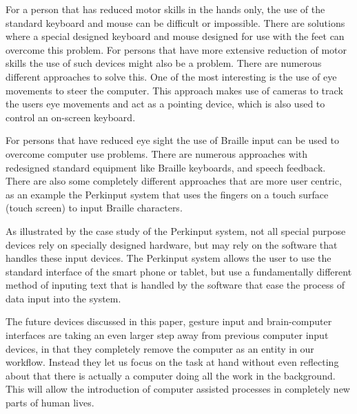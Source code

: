 
For a person that has reduced motor skills in the hands only, the use of the standard keyboard and mouse can be difficult or impossible. There are solutions where a special designed keyboard and mouse designed for use with the feet can overcome this problem.
For persons that have more extensive reduction of motor skills the use of such devices might also be a problem. There are numerous different approaches to solve this. One of the most interesting is the use of eye movements to steer the computer. This approach makes use of cameras to track the users eye movements and act as a pointing device, which is also used to control an on-screen keyboard. 

For persons that have reduced eye sight the use of Braille input can be used to overcome computer use problems. There are numerous approaches with redesigned standard equipment like Braille keyboards, and speech feedback. There are also some completely different approaches that are more user centric, as an example the Perkinput system that uses the fingers on a touch surface (touch screen) to input Braille characters.

As illustrated by the case study of the Perkinput system, not all special purpose devices rely on specially designed hardware, but may rely on the software that handles these input devices. The Perkinput system allows the user to use the standard interface of the smart phone or tablet, but use a fundamentally different method of inputing text that is handled by the software that ease the process of data input into the system.




The future devices discussed in this paper, gesture input and brain-computer interfaces are taking an even larger step away from previous computer input devices, in that they completely remove the computer as an entity in our workflow. Instead they let us focus on the task at hand without even reflecting about that there is actually a computer doing all the work in the background. This will allow the introduction of computer assisted processes in completely new parts of human lives. 

